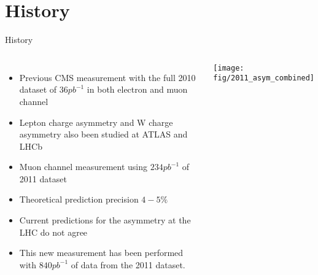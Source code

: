 \documentclass[t, 8pt]{beamer}
\begin{document}
\section{History}

\begin{frame}{History}
  \begin{columns}[c]
  \begin{itemize}
    \item Previous CMS measurement with the full 2010 dataset of $36 pb^{-1}$ in both electron and muon channel
    \item Lepton charge asymmetry and W charge asymmetry also been studied at ATLAS and LHCb
    \item Muon channel measurement using $234pb^{-1}$ of 2011 dataset
    \item Theoretical prediction precision $4-5 \%$
    \item Current predictions for the asymmetry at the LHC do not agree
    \vspace{0.25cm}
    \item This new measurement has been performed with $840pb^{-1}$ of data from the 2011 dataset.
  \end{itemize}
    \texttt{[image: fig/2011\_asym\_combined]}
  \end{columns}
\end{frame}





\end{document}
